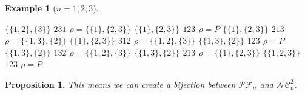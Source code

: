 \documentclass[12pt]{report}
\newtheorem*{prop}{Proposition}
\newtheorem*{example}{Example}
\begin{document}
\begin{example}[$n = 1, 2, 3$]
\begin{itemize}
            \subitem $\{\{1, 2\}, \{3\}\}$ \hspace{14mm}
                $231$ \hspace{1cm} $\rho = \{\{1\}, \{2, 3\}\}$
            \subitem $\{\{1\}, \{2, 3\}\}$ \hspace{14mm}
                $123$ \hspace{1cm} $\rho = P$
            \subitem $\{\{1\}, \{2, 3\}\}$ \hspace{14mm}
                $213$ \hspace{1cm} $\rho = \{\{1, 3\}, \{2\}\}$
            \subitem $\{\{1\}, \{2, 3\}\}$ \hspace{14mm}
                $312$ \hspace{1cm} $\rho = \{\{1, 2\}, \{3\}\}$
            \subitem $\{\{1, 3\}, \{2\}\}$ \hspace{14mm}
                $123$ \hspace{1cm} $\rho = P$
            \subitem $\{\{1, 3\}, \{2\}\}$ \hspace{14mm}
                $132$ \hspace{1cm} $\rho = \{\{1, 2\}, \{3\}\}$
            \subitem $\{\{1, 3\}, \{2\}\}$ \hspace{14mm}
                $213$ \hspace{1cm} $\rho = \{\{1\}, \{2, 3\}\}$  
            \subitem $\{\{1, 2, 3\}\}$ \hspace{18mm}
                $123$ \hspace{1cm} $\rho = P$\\
    \end{itemize}
\end{example}

\begin{prop}
    This means we can create a \emph{bijection} between
    $\mathcal{PF}_n$ and $\mathcal{NC}^2_n$.
\end{prop}
\end{document}
